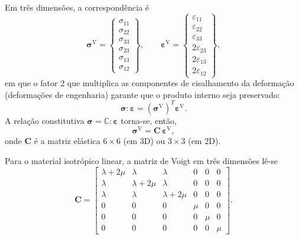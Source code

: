\noindent Em três dimensões, a correspondência é
\begin{equation}
    \boldsymbol{\sigma}^{\text{V}} =
    \begin{Bmatrix}
        \sigma_{11} \\ \sigma_{22} \\ \sigma_{33} \\ \sigma_{23} \\ \sigma_{13} \\ \sigma_{12}
    \end{Bmatrix},
    \qquad
    \boldsymbol{\varepsilon}^{\text{V}} =
    \begin{Bmatrix}
        \varepsilon_{11} \\ \varepsilon_{22} \\ \varepsilon_{33} \\ 2\varepsilon_{23} \\ 2\varepsilon_{13} \\ 2\varepsilon_{12}
    \end{Bmatrix},
    \label{eq:3.28}
\end{equation}
em que o fator 2 que multiplica as componentes de cisalhamento da deformação (deformações de engenharia) garante que o produto interno seja preservado:
\begin{equation}
    \boldsymbol{\sigma}:\boldsymbol{\varepsilon} = (\boldsymbol{\sigma}^{\text{V}})^T \boldsymbol{\varepsilon}^{\text{V}}.
\end{equation}
A relação constitutiva \(\boldsymbol{\sigma} = \mathbb{C}:\boldsymbol{\varepsilon}\) torna-se, então,
\begin{equation}
    \boldsymbol{\sigma}^{\text{V}} = \mathbf{C}\,\boldsymbol{\varepsilon}^{\text{V}},
    \label{eq:3.29}
\end{equation}
onde \(\mathbf{C}\) é a matriz elástica \(6\times 6\) (em 3D) ou \(3\times 3\) (em 2D).

\noindent Para o material isotrópico linear, a matriz de Voigt em três dimensões lê-se
\begin{equation}
    \mathbf{C} =
    \begin{bmatrix}
        \lambda+2\mu & \lambda & \lambda & 0 & 0 & 0 \\
        \lambda & \lambda+2\mu & \lambda & 0 & 0 & 0 \\
        \lambda & \lambda & \lambda+2\mu & 0 & 0 & 0 \\
        0 & 0 & 0 & \mu & 0 & 0 \\
        0 & 0 & 0 & 0 & \mu & 0 \\
        0 & 0 & 0 & 0 & 0 & \mu
    \end{bmatrix}.
    \label{eq:3.30}
\end{equation}

